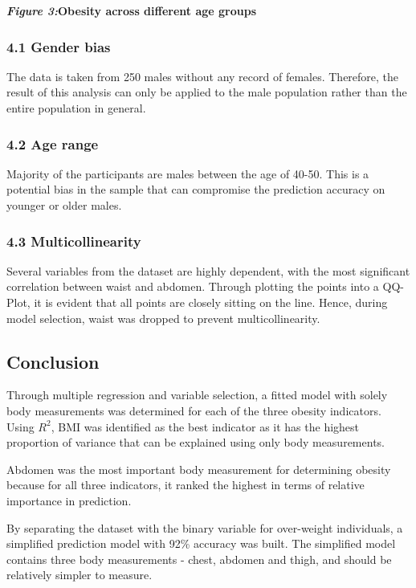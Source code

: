 \documentclass[a4paper,9pt,twocolumn,twoside,]{pinp}
\begin{document}
\textbf{\textit{Figure 3:}Obesity across different age groups}

\hypertarget{gender-bias}{%
\subsubsection{4.1 Gender bias}\label{gender-bias}}

The data is taken from 250 males without any record of females.
Therefore, the result of this analysis can only be applied to the male
population rather than the entire population in general.

\hypertarget{age-range}{%
\subsubsection{4.2 Age range}\label{age-range}}

Majority of the participants are males between the age of 40-50. This is
a potential bias in the sample that can compromise the prediction
accuracy on younger or older males.

\hypertarget{multicollinearity}{%
\subsubsection{4.3 Multicollinearity}\label{multicollinearity}}

Several variables from the dataset are highly dependent, with the most
significant correlation between waist and abdomen. Through plotting the
points into a QQ-Plot, it is evident that all points are closely sitting
on the line. Hence, during model selection, waist was dropped to prevent
multicollinearity.

\hypertarget{conclusion}{%
\subsection{Conclusion}\label{conclusion}}

Through multiple regression and variable selection, a fitted model with
solely body measurements was determined for each of the three obesity
indicators. Using \(R^2\), BMI was identified as the best indicator as
it has the highest proportion of variance that can be explained using
only body measurements.

Abdomen was the most important body measurement for determining obesity
because for all three indicators, it ranked the highest in terms of
relative importance in prediction.

By separating the dataset with the binary variable for over-weight
individuals, a simplified prediction model with 92\% accuracy was built.
The simplified model contains three body measurements - chest, abdomen
and thigh, and should be relatively simpler to measure.
\end{document}
